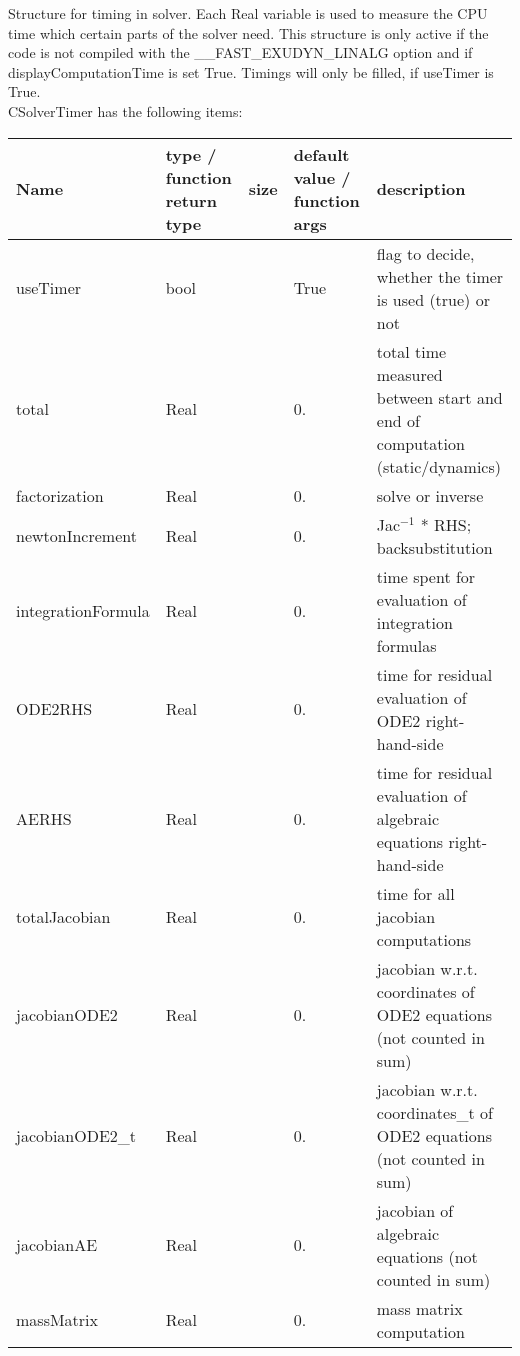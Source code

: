  \label{sec_CSolverTimer}
Structure for timing in solver. Each Real variable is used to measure the CPU time which certain parts of the solver need. This structure is only active if the code is not compiled with the \_\_FAST\_EXUDYN\_LINALG option and if displayComputationTime is set True. Timings will only be filled, if useTimer is True.\\ 
%
CSolverTimer has the following items:
\begin{center}
  \footnotesize
  \begin{longtable}{| p{4.2cm} | p{2.5cm} | p{0.3cm} | p{3.0cm} | p{6cm} |}
    \hline
    \bf Name & \bf type / function return type & \bf size & \bf default value / function args & \bf description \\ \hline
    useTimer &     bool &      &     True &     flag to decide, whether the timer is used (true) or not\\ \hline
    total &     Real &      &     0. &     total time measured between start and end of computation (static/dynamics)\\ \hline
    factorization &     Real &      &     0. &     solve or inverse\\ \hline
    newtonIncrement &     Real &      &     0. &     Jac$^{-1}$ * RHS; backsubstitution\\ \hline
    integrationFormula &     Real &      &     0. &     time spent for evaluation of integration formulas\\ \hline
    ODE2RHS &     Real &      &     0. &     time for residual evaluation of ODE2 right-hand-side\\ \hline
    AERHS &     Real &      &     0. &     time for residual evaluation of algebraic equations right-hand-side\\ \hline
    totalJacobian &     Real &      &     0. &     time for all jacobian computations\\ \hline
    jacobianODE2 &     Real &      &     0. &     jacobian w.r.t. coordinates of ODE2 equations (not counted in sum)\\ \hline
    jacobianODE2\_t &     Real &      &     0. &     jacobian w.r.t. coordinates\_t of ODE2 equations (not counted in sum)\\ \hline
    jacobianAE &     Real &      &     0. &     jacobian of algebraic equations (not counted in sum)\\ \hline
    massMatrix &     Real &      &     0. &     mass matrix computation\\ \hline

\end{longtable}
\end{center}
